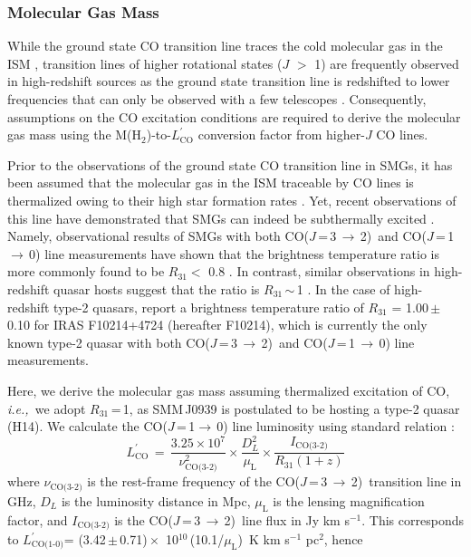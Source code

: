 \documentclass[iop]{emulateapj}
\newcommand{\rarr}{$\rightarrow$}
\newcommand{\CO}{\mbox{CO($J$\,=\,3\,$\rightarrow$\,2) }}
\newcommand{\Lp}{\mbox{$L^{\prime}_\textrm{CO(1-0)}$}}
\newcommand{\LpU}{\mbox{K\,\,km\,\,s$^{-1}$\,\,pc$^2$}}
\newcommand{\eg}{{\sl e.g.,~}}
\newcommand{\ie}{{\sl i.e.,~}}
\newcommand{\pmOne}{\mbox{$^{-1}$}}
\begin{document}
\subsubsection{Molecular Gas Mass}
While the ground state CO transition line traces the cold molecular gas in the ISM
\citep*[\eg][]{Wilson70a,Downes98a}, transition lines of higher rotational states ($J$ $>$ 1) are frequently observed in high-redshift sources as the
 ground state transition line is redshifted to lower frequencies that can only be observed with a few telescopes
 \citep{Carilli13a}. Consequently, assumptions on the CO excitation conditions are required to derive the molecular gas mass using the M(H$_\textrm{2}$)-to-$L^{\prime}_\textrm{CO}$
 conversion factor from higher-$J$ CO lines. \par
Prior to the observations of the ground state CO transition line in SMGs, it has been assumed that the molecular gas in the
  ISM traceable by CO lines is thermalized owing to their high star formation rates \citep[\eg][]{Greve05a, Coppin08a}.
   Yet, recent observations of this line have demonstrated that SMGs can indeed be subthermally excited
   \citep{Harris10a,Riechers11c,Riechers11d,Ivison11a}. Namely, observational results of SMGs with both \CO and CO($J$\,=\,1\,\rarr\,0) line measurements have shown that the
   brightness temperature ratio is more commonly found to be $R_\textrm{31}<$ 0.8 \citep
   {Harris10a,Carilli10a,Swinbank2010a,Ivison10d,Ivison11a,Riechers11d}. In contrast, similar observations in high-redshift quasar hosts suggest that the ratio
   is $R_\textrm{31}$\,$\sim$\,1 \citep{Riechers06a, Riechers11a}. In the case of high-redshift type-2 quasars, \citet{Riechers11a} report a brightness temperature ratio of $R_\textrm{31}$ = 1.00\,$\pm$\,0.10 for IRAS F10214+4724 (hereafter F10214), which is currently the only known type-2 quasar with both \CO and CO($J$\,=\,1\,\rarr\,0) line measurements. \par
Here, we derive the molecular gas mass
assuming thermalized excitation of CO,
\ie we adopt $R_\textrm{31}$\,=\,1, as SMM\,J0939 is
postulated to be hosting a type-2 quasar (H14).
We calculate the CO($J$\,=\,1\rarr\,0) line luminosity using standard relation
\citep[\eg][]{Solomon05a,Carilli13a}:
\begin{equation}
L^{\prime}_\textrm{CO}\,=\,\frac{3.25\times10^7}{\nu_\textrm{CO(3-2)}^2}\times \frac{D_L^2}{\mu_\textrm{L}} \times
\frac{I_\textrm{CO(3-2)}} {R_\textrm{31} (1 + z)}
\end{equation}
where $\nu_\textrm{CO(3-2)}$ is the rest-frame frequency of the \CO transition line in GHz, $D_L$ is the luminosity distance in Mpc, $\mu_\textrm{L}$ is the lensing magnification factor, and $I_\textrm{CO(3-2)}$ is the \CO line flux in Jy\,\,km\,\,s\pmOne. This corresponds to \Lp = (3.42\,$\pm$\,0.71)\,$\times$~10$^{10}$\,(10.1/$\mu_\textrm{L}$)~\LpU, hence
\end{document}
